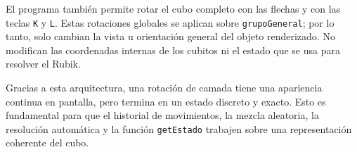 \documentclass[12pt,a4paper]{article}
\begin{document}
El programa también permite rotar el cubo completo con las flechas y con las teclas \texttt{K} y \texttt{L}. Estas rotaciones globales se aplican sobre \texttt{grupoGeneral}; por lo tanto, solo cambian la vista u orientación general del objeto renderizado. No modifican las coordenadas internas de los cubitos ni el estado que se usa para resolver el Rubik.

Gracias a esta arquitectura, una rotación de camada tiene una apariencia continua en pantalla, pero termina en un estado discreto y exacto. Esto es fundamental para que el historial de movimientos, la mezcla aleatoria, la resolución automática y la función \texttt{getEstado} trabajen sobre una representación coherente del cubo.
\end{document}
